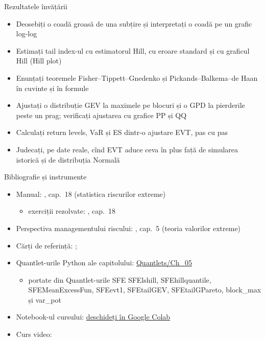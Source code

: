 \begin{frame}{Rezultatele învățării}
\itemsize{\small}
\begin{itemize}
    \item Deosebiți o coadă groasă de una subțire și interpretați o coadă pe un grafic log-log
    \item Estimați tail index-ul cu estimatorul Hill, cu eroare standard și cu graficul Hill (Hill plot)
    \item Enunțați teoremele Fisher--Tippett--Gnedenko și Pickands--Balkema--de Haan în cuvinte și în formule
    \item Ajustați o distribuție GEV la maximele pe blocuri și o GPD la pierderile peste un prag; verificați ajustarea cu grafice PP și QQ
    \item Calculați return levels, VaR și ES dintr-o ajustare EVT, pas cu pas
    \item Judecați, pe date reale, cînd EVT aduce ceva în plus față de simularea istorică și de distribuția Normală
\end{itemize}
\end{frame}

\begin{frame}{Bibliografie și instrumente}
\itemsize{\small}
\begin{itemize}
    \item Manual: , cap.~18 (statistica riscurilor extreme)
    \begin{itemize}
        \item exerciții rezolvate: , cap.~18
    \end{itemize}
    \item Perspectiva managementului riscului: , cap.~5 (teoria valorilor extreme)
    \item Cărți de referință: ; 
    \item Quantlet-urile Python ale capitolului: \href{https://github.com/danpele/SFM/tree/main/Quantlets/Ch_05}{Quantlets/Ch\_05}
    \begin{itemize}
        \item portate din Quantlet-urile SFE SFElshill, SFEhillquantile, SFEMeanExcessFun, SFEevt1, SFEtailGEV, SFEtailGPareto, block\_max și var\_pot
    \end{itemize}
    \item Notebook-ul cursului: \href{\colaburl{notebooks/EN/chapter5_lecture_notebook.ipynb}}{deschideți în Google Colab}
    \item Curs video: 
\end{itemize}
\end{frame}


